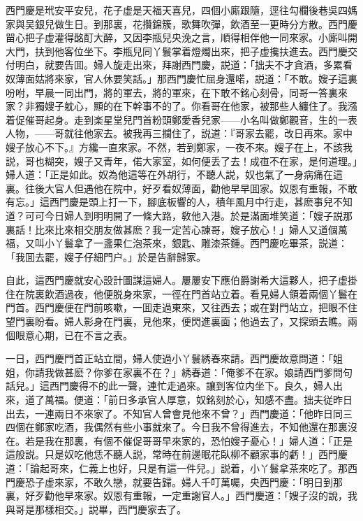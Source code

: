 西門慶是玳安平安兒，花子虚是天福天喜兒，四個小廝跟隨，逕往勾欄後巷吳四媽家與吴銀兒做生日。到那裏，花攢錦簇，歌舞吹彈，飲酒至一更時分方散。西門慶㽞心把子虚灌得酩酊大醉，又因李瓶兒央浼之言，順得相伴他一同來家。小廝叫開大門，扶到他客位坐下。李瓶兒同丫鬟掌着燈燭出來，把子虚攙扶進去。西門慶交付明白，就要告囬。婦人旋走出來，拜謝西門慶，説道：「拙夫不才貪酒，多累看奴薄面姑將來家，官人休要笑話。」那西門慶忙屈身還喏，説道：「不敢。嫂子這裏吩咐，早晨一同出門，將的軍去，將的軍來，在下敢不銘心刻骨，同哥一答裏來家？非獨嫂子躭心，顯的在下幹事不的了。你看哥在他家，被那些人纏住了。我漒着促催哥起身。走到楽星堂兒門首粉頭鄭愛香兒家——小名叫做鄭觀音，生的一表人物，——哥就往他家去。被我再三攔住了，説道：『哥家去罷，改日再來。家中嫂子放心不下。』方纔一直來家。不然，若到鄭家，一夜不來。嫂子在上，不該我説，哥也糊突，嫂子又青年，偌大家室，如何便丢了去！成亱不在家，是何道理。」婦人道：「正是如此。奴為他這等在外胡行，不聽人説，奴也氣了一身病痛在這裏。往後大官人但遇他在院中，好歹看奴薄面，勸他早早囬家。奴恩有重報，不敢有忘。」這西門慶是頭上打一下，腳底板響的人，積年風月中行走，甚麽事兒不知道？可可今日婦人到明明開了一條大路，敎他入港。於是滿面堆笑道：「嫂子説那裏話！比來比來相交朋友做甚麽？我一定苦心諫哥，嫂子放心！」婦人又道個萬福，又叫小丫鬟拿了一盞果仁泡茶來，銀匙、雕漆茶鍾。西門慶吃畢茶，説道：「我囬去罷，嫂子仔細門户。」於是告辭歸家。

自此，這西門慶就安心設計圖謀這婦人。屢屢安下應伯爵謝希大這夥人，把子虚掛住在院裏飲酒過夜，他便脱身來家，一徑在門首站立着。看見婦人領着兩個丫鬟在門首。西門慶便在門前咳嗽，一囬走過東來，又往西去；或在對門站立，把眼不住望門裏盼看。婦人影身在門裏，見他來，便閃進裏面；他過去了，又探頭去瞧。兩個眼意心期，已在不言之表。

一日，西門慶門首正站立間，婦人使過小丫鬟綉春來請。西門慶故意問道：「姐姐，你請我做甚麽？你爹在家裏不在？」綉春道：「俺爹不在家。娘請西門爹問句話兒。」這西門慶得不的此一聲，連忙走過來。讓到客位内坐下。良久，婦人出來，道了萬福。便道：「前日多承官人厚意，奴銘刻於心，知感不盡。拙夫従昨日出去，一連兩日不來家了。不知官人曾會見他來不曾？」西門慶道：「他昨日同三四個在鄭家吃酒，我偶然有些小事就來了。今日我不曾得進去，不知他還在那裏沒在。若是我在那裏，有個不催促哥哥早來家的，恐怕嫂子憂心！」婦人道：「正是這般説。只是奴吃他恁不聽人説，常時在前邊眠花臥柳不顧家事的虧！」西門慶道：「論起哥來，仁義上也好，只是有這一件兒。」説着，小丫鬟拿茶來吃了。那西門慶恐子虚來家，不敢久戀，就要告歸。婦人千叮萬囑，央西門慶：「明日到那裏，好歹勸他早來家。奴恩有重報，一定重謝官人。」西門慶道：「嫂子沒的說，我與哥是那樣相交。」説畢，西門慶家去了。

